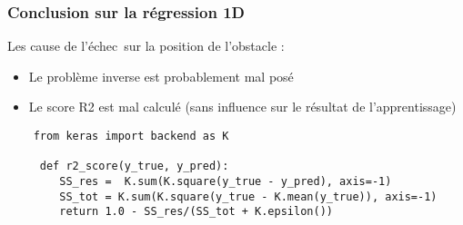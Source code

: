 \begin{frame}[fragile]
    \frametitle{Conclusion sur la régression 1D}
Les cause de l'échec sur la position de l'obstacle :
\begin{itemize}
    \item Le problème inverse est probablement mal posé  %
\pause
    \item Le score R2 est mal calculé (sans influence sur le résultat de l'apprentissage) %
\end{itemize}

\scriptsize
\begin{verbatim}
    from keras import backend as K
    
     def r2_score(y_true, y_pred):
        SS_res =  K.sum(K.square(y_true - y_pred), axis=-1) 
        SS_tot = K.sum(K.square(y_true - K.mean(y_true)), axis=-1)
        return 1.0 - SS_res/(SS_tot + K.epsilon())
\end{verbatim}

\end{frame}


% 
